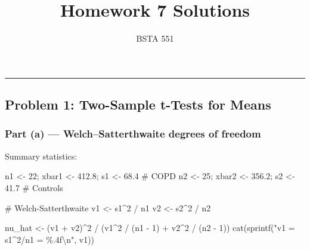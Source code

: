 \documentclass[
  letterpaper,
  DIV=11,
  numbers=noendperiod]{scrartcl}
\title{Homework 7 Solutions}
\subtitle{BSTA 551}
\author{}
\date{}
\newenvironment{Shaded}{\begin{snugshade}}{\end{snugshade}}
\newcommand{\CommentTok}[1]{\textcolor[rgb]{0.37,0.37,0.37}{#1}}
\newcommand{\DecValTok}[1]{\textcolor[rgb]{0.68,0.00,0.00}{#1}}
\newcommand{\FloatTok}[1]{\textcolor[rgb]{0.68,0.00,0.00}{#1}}
\newcommand{\FunctionTok}[1]{\textcolor[rgb]{0.28,0.35,0.67}{#1}}
\newcommand{\NormalTok}[1]{\textcolor[rgb]{0.00,0.23,0.31}{#1}}
\newcommand{\OtherTok}[1]{\textcolor[rgb]{0.00,0.23,0.31}{#1}}
\newcommand{\SpecialCharTok}[1]{\textcolor[rgb]{0.37,0.37,0.37}{#1}}
\newcommand{\StringTok}[1]{\textcolor[rgb]{0.13,0.47,0.30}{#1}}
\begin{document}
\maketitle


\begin{center}\rule{0.5\linewidth}{0.5pt}\end{center}

\subsection{Problem 1: Two-Sample t-Tests for
Means}\label{problem-1-two-sample-t-tests-for-means}

\subsubsection{Part (a) --- Welch--Satterthwaite degrees of
freedom}\label{part-a-welchsatterthwaite-degrees-of-freedom}

Summary statistics:

\begin{Shaded}
\begin{Highlighting}[]
\NormalTok{n1 }\OtherTok{\textless{}{-}} \DecValTok{22}\NormalTok{; xbar1 }\OtherTok{\textless{}{-}} \FloatTok{412.8}\NormalTok{; s1 }\OtherTok{\textless{}{-}} \FloatTok{68.4}  \CommentTok{\# COPD}
\NormalTok{n2 }\OtherTok{\textless{}{-}} \DecValTok{25}\NormalTok{; xbar2 }\OtherTok{\textless{}{-}} \FloatTok{356.2}\NormalTok{; s2 }\OtherTok{\textless{}{-}} \FloatTok{41.7}  \CommentTok{\# Controls}

\CommentTok{\# Welch{-}Satterthwaite}
\NormalTok{v1 }\OtherTok{\textless{}{-}}\NormalTok{ s1}\SpecialCharTok{\^{}}\DecValTok{2} \SpecialCharTok{/}\NormalTok{ n1}
\NormalTok{v2 }\OtherTok{\textless{}{-}}\NormalTok{ s2}\SpecialCharTok{\^{}}\DecValTok{2} \SpecialCharTok{/}\NormalTok{ n2}

\NormalTok{nu\_hat }\OtherTok{\textless{}{-}}\NormalTok{ (v1 }\SpecialCharTok{+}\NormalTok{ v2)}\SpecialCharTok{\^{}}\DecValTok{2} \SpecialCharTok{/}\NormalTok{ (v1}\SpecialCharTok{\^{}}\DecValTok{2} \SpecialCharTok{/}\NormalTok{ (n1 }\SpecialCharTok{{-}} \DecValTok{1}\NormalTok{) }\SpecialCharTok{+}\NormalTok{ v2}\SpecialCharTok{\^{}}\DecValTok{2} \SpecialCharTok{/}\NormalTok{ (n2 }\SpecialCharTok{{-}} \DecValTok{1}\NormalTok{))}
\FunctionTok{cat}\NormalTok{(}\FunctionTok{sprintf}\NormalTok{(}\StringTok{"v1 = s1\^{}2/n1 = \%.4f}\SpecialCharTok{\textbackslash{}n}\StringTok{"}\NormalTok{, v1))}
\end{Highlighting}
\end{Shaded}
\end{document}
